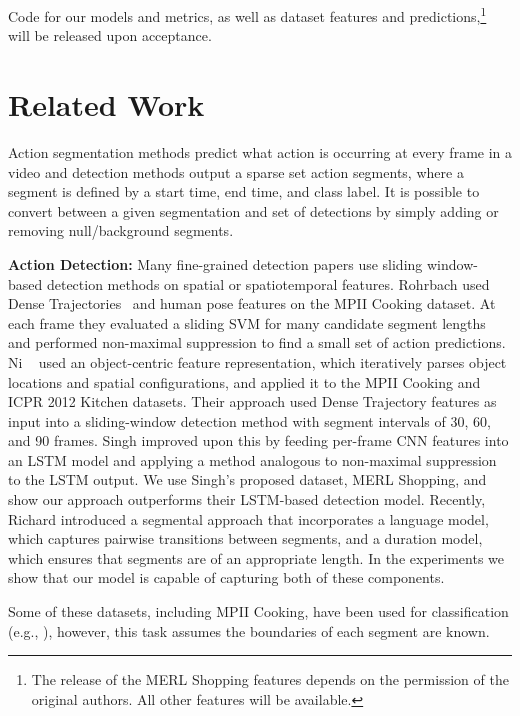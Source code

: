 \documentclass[10pt,twocolumn,letterpaper]{article}
\newcommand{\fakesubsection}[1]{\smallskip\noindent\textbf{#1:}}
\begin{document}
Code for our models and metrics, as well as dataset features and predictions,\footnote{The release of the MERL Shopping features depends on the permission of the original authors. All other features will be available.} will be released upon acceptance.




 \section{Related Work}
\label{sec:related}

Action segmentation methods predict what action is occurring at every frame in a video and detection methods output a sparse set action segments, where a segment is defined by a start time, end time, and class label. It is possible to convert between a given segmentation and set of detections by simply adding or removing null/background segments.






\fakesubsection{Action Detection}
Many fine-grained detection papers use sliding window-based detection methods on spatial or spatiotemporal features. 
Rohrbach \etal \cite{rohrbach_ijcv_2015} used Dense Trajectories~\cite{wang_iccv_2013} and human pose features on the MPII Cooking dataset. At each frame they evaluated a sliding SVM for many candidate segment lengths and performed non-maximal suppression to find a small set of action predictions.
Ni \etal~\cite{ni_cvpr_2016} used an object-centric feature representation, which iteratively parses object locations and spatial configurations, and applied it to the MPII Cooking and ICPR 2012 Kitchen datasets. Their approach used Dense Trajectory features as input into a sliding-window detection method with segment intervals of 30, 60, and 90 frames.
Singh \etal \cite{singh_cvpr_2016_merl} improved upon this by feeding per-frame CNN features into an LSTM model and applying a method analogous to non-maximal suppression to the LSTM output.
We use Singh's proposed dataset, MERL Shopping, and show our approach outperforms their LSTM-based detection model.
Recently, Richard \etal \cite{richard_cvpr_2016} introduced a segmental approach that incorporates a language model, which captures pairwise transitions between segments, and a duration model, which ensures that segments are of an appropriate length. In the experiments we show that our model is capable of capturing both of these components. 


Some of these datasets, including MPII Cooking, have been used for classification (e.g., \cite{cheron_iccv_2015,zhou_cvpr_2015}), however, this task assumes the boundaries of each segment are known.
\end{document}
